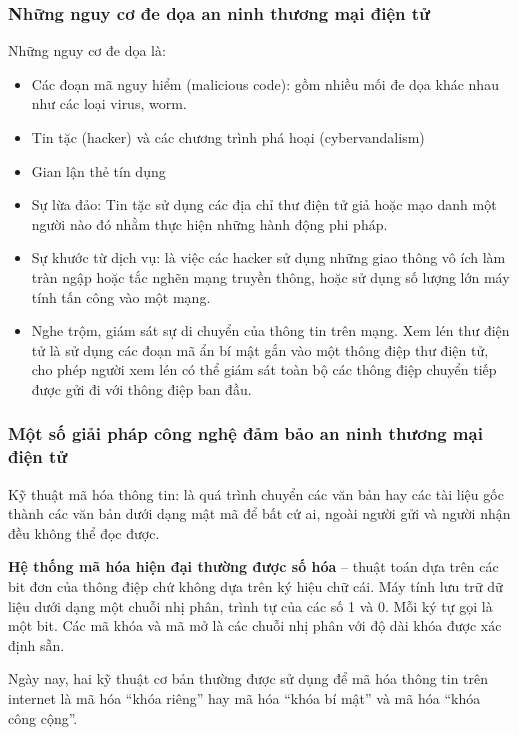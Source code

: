 \documentclass[12pt]{article}
\begin{document}
\subsubsection{Những nguy cơ đe dọa an ninh thương mại điện tử}
Những nguy cơ đe dọa là:
\begin{itemize}
\item Các đoạn mã nguy hiểm (malicious code): gồm nhiều mối đe dọa khác nhau như các loại virus, worm.

\item Tin tặc (hacker) và các chương trình phá hoại (cybervandalism)

\item Gian lận thẻ tín dụng

\item Sự lừa đảo: Tin tặc sử dụng các địa chỉ thư điện tử giả
hoặc mạo danh một người nào đó nhằm thực hiện
những hành động phi pháp.

\item Sự khước từ dịch vụ: là việc các hacker sử dụng những giao thông vô ích làm tràn ngập hoặc tắc nghẽn mạng truyền thông, hoặc sử dụng số lượng lớn máy tính tấn công vào một mạng.

\item Nghe trộm, giám sát sự di chuyển của thông tin trên mạng. Xem lén thư điện tử là sử dụng các đoạn mã ẩn bí mật gắn vào một thông điệp thư điện tử, cho phép người xem lén có thể giám sát toàn bộ các thông điệp chuyển tiếp được gửi đi với thông điệp ban đầu.
\end{itemize}

\subsubsection{Một số giải pháp công nghệ đảm bảo an ninh thương mại điện tử}
Kỹ thuật mã hóa thông tin: là quá trình chuyển các văn bản hay các tài liệu gốc thành các văn bản dưới dạng mật mã để bất cứ ai, ngoài người gửi và người nhận đều không thể đọc được.
 
\textbf{Hệ thống mã hóa hiện đại thường được số hóa} – thuật toán dựa trên các bit đơn của thông điệp chứ không dựa trên ký hiệu chữ cái. Máy tính lưu trữ dữ liệu dưới dạng một chuỗi nhị phân, trình tự của các số 1 và 0. Mỗi ký tự gọi là một bit. Các mã khóa và mã mở là các chuỗi nhị phân với độ dài khóa được xác định sẵn.
 
Ngày nay, hai kỹ thuật cơ bản thường được sử dụng để mã hóa thông tin trên internet là mã hóa “khóa riêng” hay mã hóa “khóa bí mật” và mã hóa “khóa công cộng”. 
\end{document}
